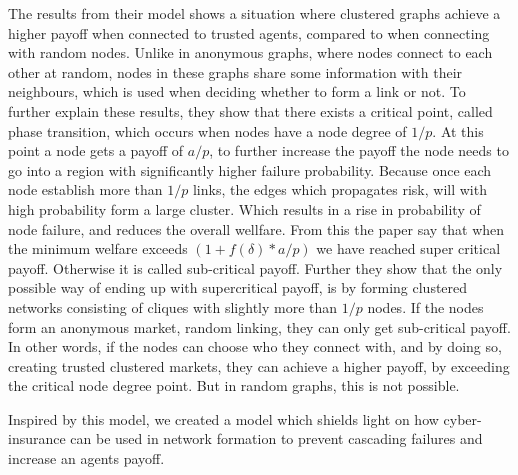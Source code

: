The results from their model shows a situation where clustered graphs achieve a higher payoff when connected to trusted agents, compared to when connecting with random nodes. Unlike in anonymous graphs, where nodes connect to each other at random, nodes in these graphs share some information with their neighbours, which is used when deciding whether to form a link or not. 
To further explain these results, they show that there exists a critical point, called phase transition, which occurs when nodes have a node degree of $1/p$. 
At this point a node gets a payoff of $a/p$, to further increase the payoff the node needs to go into a region with significantly higher failure probability. 
Because once each node establish more than $1/p$ links, the edges which propagates risk, will with high probability form a large cluster. Which results in a rise in probability of node failure, and reduces the overall wellfare.
From this the paper say that when the minimum welfare exceeds 
$(1+f(\delta)*a/p)$
we have reached super critical payoff. Otherwise it is called sub-critical payoff. 
Further they show that the only possible way of ending up with supercritical payoff, is by forming clustered networks consisting of cliques with slightly more than $1/p$ nodes. 
If the nodes form an anonymous market, random linking, they can only get sub-critical payoff. 
In other words, if the nodes can choose who they connect with, and by doing so, creating trusted clustered markets, they can achieve a higher payoff, by exceeding the critical node degree point. But in random graphs, this is not possible. 


Inspired by this model, we created a model which shields light on how cyber-insurance can be used in network formation to prevent cascading failures and increase an agents payoff.  


